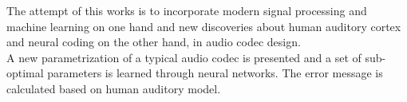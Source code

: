 The attempt of this works is to incorporate modern signal processing and machine learning on one hand and new discoveries about human auditory cortex and neural coding on the other hand, in audio codec design.\\
A new parametrization of a typical audio codec is presented and a set of sub-optimal parameters is learned through neural networks. The error message is calculated based on human auditory model.